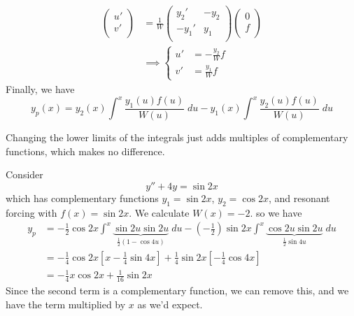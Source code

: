 \documentclass{../template/note}
\begin{document}
    \begin{align*}
        \begin{pmatrix}
         u' \\
         v' \\
        \end{pmatrix} &= \frac{1}{W} \begin{pmatrix}
         y_2' & -y_2 \\
         -y_1' & y_1 \\
        \end{pmatrix} \begin{pmatrix}
         0 \\
         f \\
        \end{pmatrix} \\
        &\implies \begin{cases}
            u' &= -\frac{y_2}{W} f \\
            v' &= \frac{y_1}{W} f
        \end{cases}
    \end{align*}
    Finally, we have
    \[
        y_p(x) = y_2(x) \int^x \frac{y_1(u)f(u)}{W(u)} \; du - y_1(x) \int^x \frac{y_2(u)f(u)}{W(u)} \; du
    \]
    \begin{remark*}
        Changing the lower limits of the integrals just adds multiples of complementary functions, which makes no difference.
    \end{remark*}
    

    \begin{example}
        Consider
        \[
            y'' + 4y = \sin 2x
        \]
        which has complementary functions \(y_1 = \sin 2x\), \(y_2 = \cos 2x\), and resonant forcing with \(f(x) = \sin 2x\). We calculate \(W(x) = -2\). so we have
        \begin{align*}
            y_p &= -\frac{1}{2}\cos 2x \int^x \underbrace{\sin 2u \sin 2u}_{\frac{1}{2}(1 - \cos 4u)} \; du -\left(-\frac{1}{2}\right) \sin 2x \int^x \underbrace{\cos 2u \sin 2u}_{\frac{1}{2}\sin 4u} \; du\\
            &= -\frac{1}{4} \cos 2x \left[x - \frac{1}{4} \sin 4x\right] + \frac{1}{4} \sin 2x \left[ -\frac{1}{4} \cos 4x \right] \\
            &= -\frac{1}{4} x \cos 2x + \frac{1}{16} \sin 2x
        \end{align*}
        Since the second term is a complementary function, we can remove this, and we have the term multiplied by \(x\) as we'd expect.
    \end{example}
    
\end{document}
